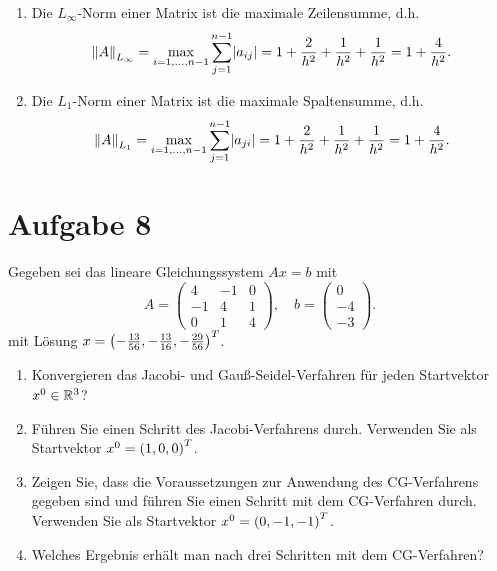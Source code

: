 \documentclass{exercise}
\begin{document}
\begin{enumerate}
\begin{enumerate}
            \item Die \(L_\infty\)-Norm einer Matrix ist die maximale Zeilensumme, d.h.
            \[
                \norm*{A}_{L_\infty} = \max_{i = 1, \ldots, n - 1}\sum_{j = 1}^{n - 1}\absolute*{a_{ij}} = 1 + \frac{2}{h^2} + \frac{1}{h^2} + \frac{1}{h^2} = 1 + \frac{4}{h^2}.
            \]
            \item Die \(L_1\)-Norm einer Matrix ist die maximale Spaltensumme, d.h.
            \[
                \norm*{A}_{L_1} = \max_{i = 1, \ldots, n - 1}\sum_{j = 1}^{n - 1}\absolute*{a_{ji}} = 1 + \frac{2}{h^2} + \frac{1}{h^2} + \frac{1}{h^2} = 1 + \frac{4}{h^2}.
            \]
        \end{enumerate}
    \end{enumerate}


    \section*{Aufgabe 8}
    
    \begin{problem}
        Gegeben sei das lineare Gleichungssystem \(Ax = b\) mit
        \[
            A = \begin{pmatrix}
                4 & -1 & 0\\
                -1 & 4 & 1\\
                0 & 1 & 4
            \end{pmatrix}, \quad b = \begin{pmatrix}
                0\\
                -4\\
                -3
            \end{pmatrix}.
        \]
        mit Lösung \(x = \parentheses*{-\frac{13}{56}, -\frac{13}{16}, -\frac{29}{56}}^T\).
        \begin{enumerate}
            \item Konvergieren das Jacobi- und Gauß-Seidel-Verfahren für jeden Startvektor \(x^0 \in \R^3\)?
            \item Führen Sie einen Schritt des Jacobi-Verfahrens durch.
            Verwenden Sie als Startvektor \(x^0 = \parentheses*{1, 0, 0}^T\).
            \item Zeigen Sie, dass die Voraussetzungen zur Anwendung des CG-Verfahrens gegeben sind und führen Sie einen Schritt mit dem CG-Verfahren durch.
            Verwenden Sie als Startvektor \(x^0 = \parentheses*{0, -1, -1}^T\).
            \item Welches Ergebnis erhält man nach drei Schritten mit dem CG-Verfahren?
        \end{enumerate}
    \end{problem}
    
\end{document}
